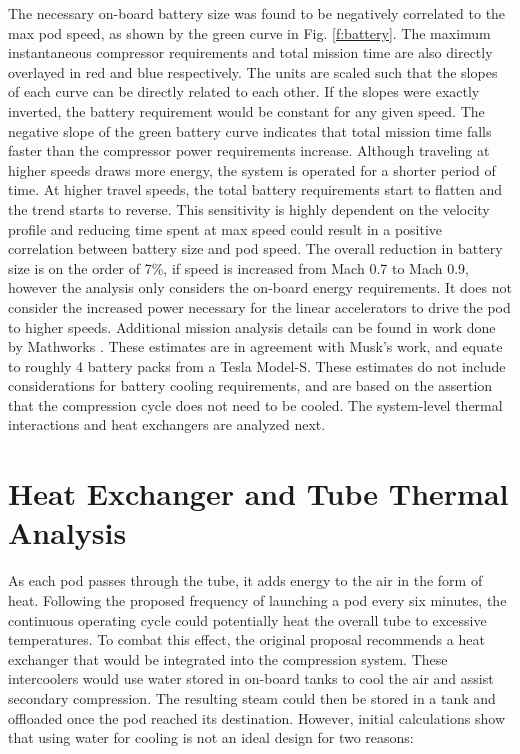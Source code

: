 \documentclass[heading.tex]{subfiles}
\begin{document}
The necessary on-board battery size was found to be negatively correlated to the max pod speed, as shown by the green curve in Fig. \ref{f:battery}.
The maximum instantaneous compressor requirements and total mission time
are also directly overlayed in red and blue respectively. 
The units are scaled such that the slopes of each curve can be directly related to each other.
If the slopes were exactly inverted, the battery requirement would be constant for any given speed.
The negative slope of the green battery curve indicates that total mission time falls faster than the compressor power requirements increase.
Although traveling at higher speeds draws more energy, the system is operated for a shorter period of time.
At higher travel speeds, the total battery requirements start to flatten and the trend starts to reverse.
This sensitivity is highly dependent on the velocity profile
and reducing time spent at max speed could result in a positive correlation between battery size and pod speed.
The overall reduction in battery size is on the order of 7\%, if speed is increased from Mach 0.7 to Mach 0.9, 
however the analysis only considers the on-board energy requirements. It does not consider the increased power
necessary for the linear accelerators to drive the pod to higher speeds. 
Additional mission analysis details can be found in work done by Mathworks \cite{Rouleau}.
These estimates are in agreement with Musk's work, and equate to roughly 4 battery packs from a Tesla Model-S.
These estimates do not include considerations for battery cooling requirements,
and are based on the assertion that the compression cycle does not need to be cooled.
The system-level thermal interactions and heat exchangers are analyzed next.

\section{Heat Exchanger and Tube Thermal Analysis}
\label{s:heatex}
As each pod passes through the tube, it adds energy to the air in the form of heat.
Following the proposed frequency of launching a pod every six minutes,
the continuous operating cycle could potentially heat the overall tube to excessive temperatures.
To combat this effect, the original proposal recommends a heat exchanger that would be integrated into the compression system.
These intercoolers would use water stored in on-board tanks to cool the air and assist secondary compression.
The resulting steam could then be stored in a tank and offloaded once the pod reached its destination.
However, initial calculations show that using water for cooling is not an ideal design for two reasons:
\end{document}
